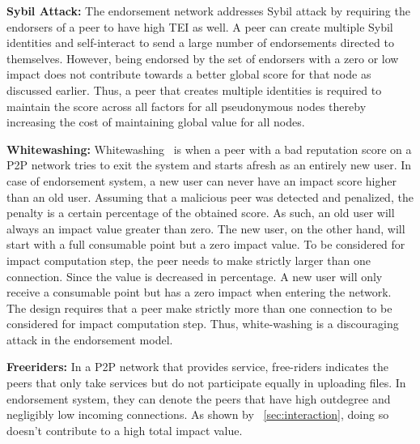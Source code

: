 \textbf{Sybil Attack:}
The endorsement network addresses Sybil attack by requiring the endorsers of a
peer to have high TEI as well. A peer can create multiple Sybil identities and
self-interact to send a large number of endorsements directed to themselves.
However, being endorsed by the set of endorsers with a zero or low impact does
not contribute towards a better global score for that node as discussed
earlier. Thus, a peer that creates multiple identities is required to maintain
the score across all factors for all pseudonymous nodes thereby increasing the
cost of maintaining global value for all nodes.


\textbf{Whitewashing:}
Whitewashing~\cite{feldman2006free} is when a peer with a bad reputation score
on a P2P network tries to exit the system and starts afresh as an entirely new
user. In case of endorsement system, a new user can never have an impact score
higher than an old user. Assuming that a malicious peer was detected and
penalized, the penalty is a certain percentage of the obtained score. As such,
an old user will always an impact value greater than zero. The new user, on the
other hand, will start with a full consumable point but a zero impact value. To
be considered for impact computation step, the peer needs to make strictly
larger than one connection.  Since the value is decreased in percentage. A new
user will only receive a consumable point but has a zero impact when entering
the network. The design requires that a peer make strictly more than one
connection to be considered for impact computation step. Thus, white-washing is
a discouraging attack in the endorsement model. 


\textbf{Freeriders:}
In a P2P network that provides service, free-riders indicates the peers that
only take services but do not participate equally in uploading files. In
endorsement system, they can denote the peers that have high outdegree and
negligibly low incoming connections. As shown by ~\ref{sec:interaction}, doing
so doesn't contribute to a high total impact value.

